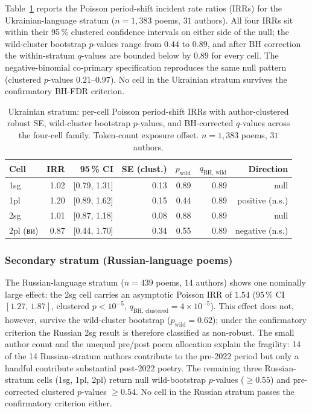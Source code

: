 \documentclass[12pt]{interact}
\theoremstyle{plain}%
\theoremstyle{definition}
\theoremstyle{remark}
\begin{document}
Table~\ref{tab:rq1-ukr} reports the Poisson period-shift incident rate ratios (IRRs) for the Ukrainian-language stratum ($n = 1{,}383$ poems, $31$ authors). All four IRRs sit within their 95\,\% clustered confidence intervals on either side of the null; the wild-cluster bootstrap $p$-values range from $0.44$ to $0.89$, and after BH correction the within-stratum $q$-values are bounded below by $0.89$ for every cell. The negative-binomial co-primary specification reproduces the same null pattern (clustered $p$-values $0.21$--$0.97$). No cell in the Ukrainian stratum survives the confirmatory BH-FDR criterion.

\begin{table}[h]
\caption{Ukrainian stratum: per-cell Poisson period-shift IRRs with author-clustered robust SE, wild-cluster bootstrap $p$-values, and BH-corrected $q$-values across the four-cell family. Token-count exposure offset. $n = 1{,}383$ poems, $31$ authors.}
\label{tab:rq1-ukr}
\centering
\small
\begin{tabular}{lrrrrrr}
\toprule
Cell & IRR & 95\,\% CI & SE (clust.) & $p_{\text{wild}}$ & $q_{\text{BH, wild}}$ & Direction \\
\midrule
1sg & 1.02 & [0.79, 1.31] & 0.13 & 0.89 & 0.89 & null \\
1pl & 1.20 & [0.89, 1.62] & 0.15 & 0.44 & 0.89 & positive (n.s.) \\
2sg & 1.01 & [0.87, 1.18] & 0.08 & 0.88 & 0.89 & null \\
2pl (\textukrainian{ви}) & 0.87 & [0.44, 1.70] & 0.34 & 0.55 & 0.89 & negative (n.s.) \\
\bottomrule
\end{tabular}
\end{table}

\subsubsection{Secondary stratum (Russian-language poems)}

The Russian-language stratum ($n = 439$ poems, $14$ authors) shows one nominally large effect: the 2sg cell carries an asymptotic Poisson IRR of $1.54$ ($95\,\%$ CI $[1.27,\,1.87]$, clustered $p < 10^{-5}$, $q_{\text{BH, clustered}} = 4 \times 10^{-5}$). This effect does not, however, survive the wild-cluster bootstrap ($p_{\text{wild}} = 0.62$); under the confirmatory criterion the Russian 2sg result is therefore classified as non-robust. The small author count and the unequal pre/post poem allocation explain the fragility: 14 of the 14 Russian-stratum authors contribute to the pre-2022 period but only a handful contribute substantial post-2022 poetry. The remaining three Russian-stratum cells (1sg, 1pl, 2pl) return null wild-bootstrap $p$-values ($\geq 0.55$) and pre-corrected clustered $p$-values $\geq 0.54$. No cell in the Russian stratum passes the confirmatory criterion either.
\end{document}
